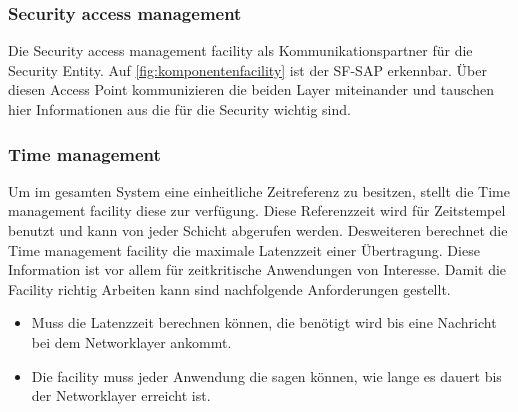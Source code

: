\subsubsection{Security access management \label{facilitylayer_AccessManagement}}
Die Security access management facility als Kommunikationspartner für die Security Entity. Auf \autoref{fig:komponentenfacility} ist der SF-SAP erkennbar. Über diesen Access Point kommunizieren die beiden Layer miteinander und tauschen hier Informationen aus die für die Security wichtig sind. 

\subsubsection{Time management \label{facilitylayer_TimeManagement}}
Um im gesamten System eine einheitliche Zeitreferenz zu besitzen, stellt die Time management facility diese zur verfügung. Diese Referenzzeit wird für Zeitstempel benutzt und kann von jeder Schicht abgerufen werden. Desweiteren  berechnet die Time management facility die maximale Latenzzeit einer Übertragung. Diese Information ist vor allem für zeitkritische Anwendungen von Interesse.
Damit die Facility richtig Arbeiten kann sind nachfolgende Anforderungen gestellt.
\begin{itemize}
\item Muss die Latenzzeit berechnen können, die benötigt wird bis eine Nachricht bei dem Networklayer ankommt. 
\item Die facility muss jeder Anwendung die sagen können, wie lange es dauert bis der Networklayer erreicht ist. 
\end{itemize}

